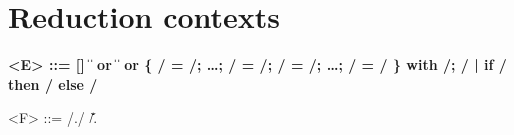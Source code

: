 \section{Reduction contexts}

\begin{grammar}
  \bfseries
  <E> ::= [] \| 
  \alt {} \|  or  \|  \|  or 
  \alt \{ \x/ = \e/; \ldots{}; \x/ = \e/; \E/ = \e/; \ldots{}; \e/ = \e/ \}
  \alt with \E/; \e/ | if \E/ then \e/ else \e/

  <F> ::= \E/.\a/ \| \v/.
\end{grammar}



